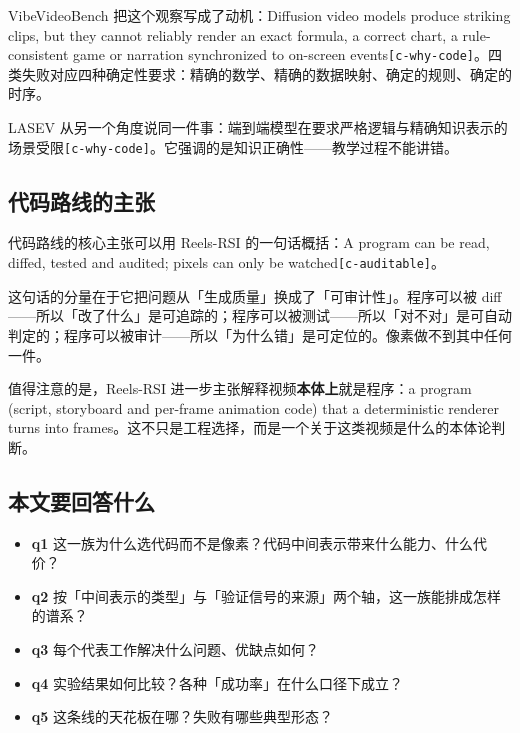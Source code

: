 VibeVideoBench 把这个观察写成了动机：Diffusion video models produce striking clips, but they cannot reliably render an exact formula, a correct chart, a rule-consistent game or narration synchronized to on-screen events{\scriptsize\texttt{[c-\hspace{0pt}why-\hspace{0pt}code]}}。四类失败对应四种确定性要求：精确的数学、精确的数据映射、确定的规则、确定的时序。


LASEV 从另一个角度说同一件事：端到端模型在要求严格逻辑与精确知识表示的场景受限{\scriptsize\texttt{[c-\hspace{0pt}why-\hspace{0pt}code]}}。它强调的是知识正确性——教学过程不能讲错。


\subsection{代码路线的主张}

代码路线的核心主张可以用 Reels-RSI 的一句话概括：A program can be read, diffed, tested and audited; pixels can only be watched{\scriptsize\texttt{[c-\hspace{0pt}auditable]}}。


这句话的分量在于它把问题从「生成质量」换成了「可审计性」。程序可以被 diff——所以「改了什么」是可追踪的；程序可以被测试——所以「对不对」是可自动判定的；程序可以被审计——所以「为什么错」是可定位的。像素做不到其中任何一件。


值得注意的是，Reels-RSI 进一步主张解释视频\textbf{本体上}就是程序：a program (script, storyboard and per-frame animation code) that a deterministic renderer turns into frames。这不只是工程选择，而是一个关于这类视频是什么的本体论判断。


\subsection{本文要回答什么}

\begin{itemize}
  \item \textbf{q1} 这一族为什么选代码而不是像素？代码中间表示带来什么能力、什么代价？
  \item \textbf{q2} 按「中间表示的类型」与「验证信号的来源」两个轴，这一族能排成怎样的谱系？
  \item \textbf{q3} 每个代表工作解决什么问题、优缺点如何？
  \item \textbf{q4} 实验结果如何比较？各种「成功率」在什么口径下成立？
  \item \textbf{q5} 这条线的天花板在哪？失败有哪些典型形态？
\end{itemize}

